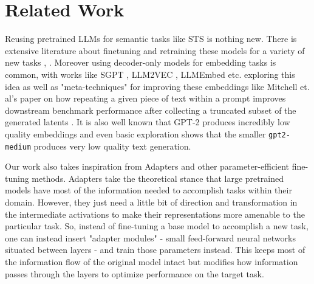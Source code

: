 \documentclass{article}
\begin{document}
\section{Related Work}
Reusing pretrained LLMs for semantic tasks like STS is nothing new. There is extensive literature about finetuning and retraining
these models for a variety of new tasks \cite{reimers2019sentencebertsentenceembeddingsusing}, \cite{tang2024poolingattentioneffectivedesigns}. Moreover using decoder-only models for embedding tasks is common, with works like
SGPT \cite{muennighoff2022sgptgptsentenceembeddings}, LLM2VEC \cite{LLM2Vec}, LLMEmbed \cite{LLMEmbed} etc. exploring this idea as well as "meta-techniques" for improving these embeddings like Mitchell et. al's paper on how repeating a given piece of text within a prompt improves downstream benchmark performance after collecting a truncated subset of the generated latents \cite{RepImprovesLLM}. It is also well known that GPT-2 produces incredibly low quality embeddings \cite{ethayarajh2019contextualcontextualizedwordrepresentations} and even basic exploration shows that the smaller \verb|gpt2-medium| produces very low quality text generation.

Our work also takes inspiration from Adapters \cite{houlsby2019parameterefficienttransferlearningnlp} and other parameter-efficient fine-tuning methods. Adapters take the theoretical stance that large pretrained models have most of the information needed to accomplish tasks within their domain. However, they just need a little bit of direction and transformation in the intermediate activations to make their representations more amenable to the particular task. So, instead of fine-tuning a base model to accomplish a new task, one can instead insert "adapter modules" - small feed-forward neural networks situated between layers - and train those parameters instead. This keeps most of the information flow of the original model intact but modifies how information passes through the layers to optimize performance on the target task. 
\end{document}

